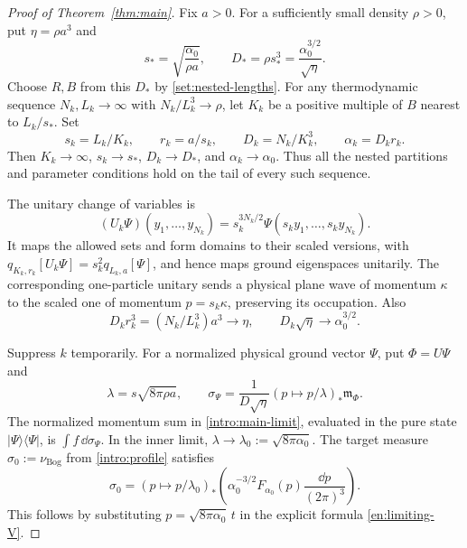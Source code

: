 \begin{proof}[Proof of Theorem~\ref{thm:main}]
Fix $a>0$. For a sufficiently small density $\rho>0$, put
$\eta=\rho a^3$ and
\begin{equation}\label{asm:physical-scale}
 s_* =\sqrt{\frac{\alpha_0}{\rho a}},\qquad
 D_* =\rho s_*^3=\frac{\alpha_0^{3/2}}{\sqrt\eta}.
\end{equation}
Choose $R,B$ from this $D_*$ by \eqref{set:nested-lengths}.
For any thermodynamic sequence $N_k,L_k\to\infty$ with
$N_k/L_k^3\to\rho$, let $K_k$ be a positive multiple of $B$ nearest
to $L_k/s_*$. Set
\[
 s_k=L_k/K_k,\qquad r_k=a/s_k,\qquad
 D_k=N_k/K_k^3,\qquad \alpha_k=D_kr_k.
\]
Then $K_k\to\infty$, $s_k\to s_*$, $D_k\to D_*$, and
$\alpha_k\to\alpha_0$. Thus all the nested partitions and parameter
conditions hold on the tail of every such sequence.

The unitary change of variables is
\begin{equation}\label{asm:unitary-scaling}
 (U_k\Psi)(y_1,\ldots,y_{N_k})
       =s_k^{3N_k/2}\Psi(s_ky_1,\ldots,s_ky_{N_k}).
\end{equation}
It maps the allowed sets and form domains to their scaled versions,
with $q_{K_k,r_k}[U_k\Psi]=s_k^2q_{L_k,a}[\Psi]$, and hence maps
ground eigenspaces unitarily. The corresponding one-particle unitary
sends a physical plane wave of momentum $\kappa$ to the scaled one
of momentum $p=s_k\kappa$, preserving its occupation. Also
\begin{equation}\label{asm:gas-identity}
 D_kr_k^3=(N_k/L_k^3)a^3\longrightarrow\eta,
 \qquad D_k\sqrt\eta\longrightarrow\alpha_0^{3/2}.
\end{equation}

Suppress $k$ temporarily. For a normalized physical ground vector
$\Psi$, put $\Phi=U\Psi$ and
\begin{equation}\label{mom:physical-measure}
 \lambda=s\sqrt{8\pi\rho a},\qquad
 \sigma_\Psi=\frac1{D\sqrt\eta}
                  (p\mapsto p/\lambda)_*\mathfrak m_\Phi.
\end{equation}
The normalized momentum sum in \eqref{intro:main-limit}, evaluated in
the pure state $|\Psi\rangle\langle\Psi|$, is
$\int f\,\dd\sigma_\Psi$. In the inner limit,
$\lambda\to\lambda_0:=\sqrt{8\pi\alpha_0}$.
The target measure $\sigma_0:=\nu_{\mathrm{Bog}}$ from
\eqref{intro:profile} satisfies
\begin{equation}\label{mom:target-measure}
 \sigma_0=(p\mapsto p/\lambda_0)_*
       \left(\alpha_0^{-3/2}F_{\alpha_0}(p)
                                    \frac{\dd p}{(2\pi)^3}\right).
\end{equation}
This follows by substituting $p=\sqrt{8\pi\alpha_0}\,t$ in the
explicit formula \eqref{en:limiting-V}.


\end{proof}
